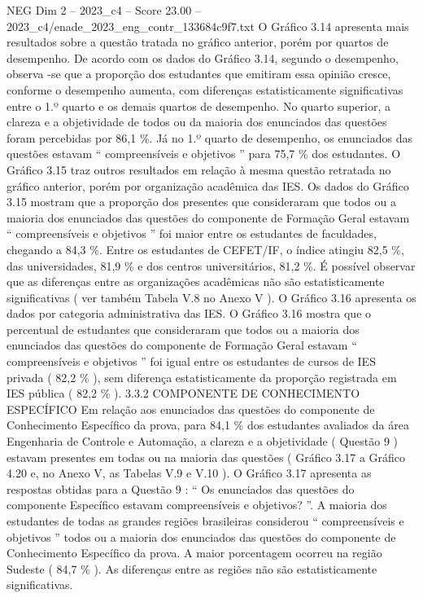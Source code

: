 \begin{textsample}{NEG Dim 2 – 2023\_c4 – Score 23.00 – 2023\_c4/enade\_2023\_eng\_contr\_133684c9f7.txt}
O Gráfico 3.14 apresenta mais resultados sobre a questão tratada no gráfico anterior, porém por quartos de desempenho.
De acordo com os dados do Gráfico 3.14, segundo o desempenho, observa -se que a proporção dos estudantes que emitiram essa opinião cresce, conforme o desempenho aumenta, com diferenças estatisticamente significativas entre o 1.º quarto e os demais quartos de desempenho.
No quarto superior, a clareza e a objetividade de todos ou da maioria dos enunciados das questões foram percebidas por 86,1 \%.
Já no 1.º quarto de desempenho, os enunciados das questões estavam “ compreensíveis e objetivos ” para 75,7 \% dos estudantes.
O Gráfico 3.15 traz outros resultados em relação à mesma questão retratada no gráfico anterior, porém por organização acadêmica das IES.
Os dados do Gráfico 3.15 mostram que a proporção dos presentes que consideraram que todos ou a maioria dos enunciados das questões do componente de Formação Geral estavam “ compreensíveis e objetivos ” foi maior entre os estudantes de faculdades, chegando a 84,3 \%.
Entre os estudantes de CEFET/IF, o índice atingiu 82,5 \%, das universidades, 81,9 \% e dos centros universitários, 81,2 \%.
É possível observar que as diferenças entre as organizações acadêmicas não são estatisticamente significativas ( ver também Tabela V.8 no Anexo V ).
O Gráfico 3.16 apresenta os dados por categoria administrativa das IES.
O Gráfico 3.16 mostra que o percentual de estudantes que consideraram que todos ou a maioria dos enunciados das questões do componente de Formação Geral estavam “ compreensíveis e objetivos ” foi igual entre os estudantes de cursos de IES privada ( 82,2 \% ), sem diferença estatisticamente da proporção registrada em IES pública ( 82,2 \% ). 3.3.2 COMPONENTE DE CONHECIMENTO ESPECÍFICO Em relação aos enunciados das questões do componente de Conhecimento Específico da prova, para 84,1 \% dos estudantes avaliados da área Engenharia de Controle e Automação, a clareza e a objetividade ( Questão 9 ) estavam presentes em todas ou na maioria das questões ( Gráfico 3.17 a Gráfico 4.20 e, no Anexo V, as Tabelas V.9 e V.10 ).
O Gráfico 3.17 apresenta as respostas obtidas para a Questão 9 : “ Os enunciados das questões do componente Específico estavam compreensíveis e objetivos? ”.
A maioria dos estudantes de todas as grandes regiões brasileiras considerou “ compreensíveis e objetivos ” todos ou a maioria dos enunciados das questões do componente de Conhecimento Específico da prova.
A maior porcentagem ocorreu na região Sudeste ( 84,7 \% ).
As diferenças entre as regiões não são estatisticamente significativas.

\end{textsample}
